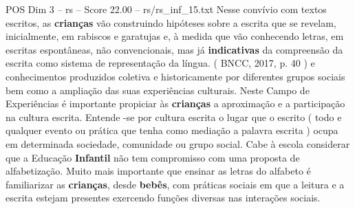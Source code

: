 \begin{textsample}{POS Dim 3 – rs – Score 22.00 – rs/rs\_inf\_15.txt}
Nesse convívio com textos escritos, as \textbf{crianças} vão construindo hipóteses sobre a escrita que se revelam, inicialmente, em rabiscos e garatujas e, à medida que vão conhecendo letras, em escritas espontâneas, não convencionais, mas já \textbf{indicativas} da compreensão da escrita como sistema de representação da língua. ( BNCC, 2017, p. 40 ) e conhecimentos produzidos coletiva e historicamente por diferentes grupos sociais bem como a ampliação das suas experiências culturais.
Neste Campo de Experiências é importante propiciar às \textbf{crianças} a aproximação e a participação na cultura escrita.
Entende -se por cultura escrita o lugar que o escrito ( todo e qualquer evento ou prática que tenha como mediação a palavra escrita ) ocupa em determinada sociedade, comunidade ou grupo social.
Cabe à escola considerar que a Educação \textbf{Infantil} não tem compromisso com uma proposta de alfabetização.
Muito mais importante que ensinar as letras do alfabeto é familiarizar as \textbf{crianças}, desde \textbf{bebês}, com práticas sociais em que a leitura e a escrita estejam presentes exercendo funções diversas nas interações sociais.

\end{textsample}
